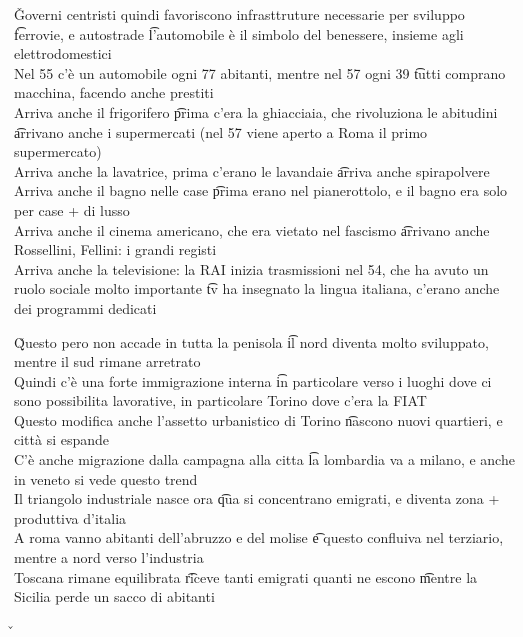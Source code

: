 \documentclass[12pt]{article}
\begin{document}
\v

Governi centristi quindi favoriscono infrasttruture necessarie per sviluppo \t ferrovie, e autostrade \t l'automobile è il simbolo del benessere, insieme agli elettrodomestici \\
Nel 55 c'è un automobile ogni 77 abitanti, mentre nel 57 ogni 39 \t tutti comprano macchina, facendo anche prestiti \\
Arriva anche il frigorifero \t prima c'era la ghiacciaia, che rivoluziona le abitudini \t arrivano anche i supermercati (nel 57 viene aperto a Roma il primo supermercato) \\
Arriva anche la lavatrice, prima c'erano le lavandaie \t arriva anche spirapolvere \\
Arriva anche il bagno nelle case \t prima erano nel pianerottolo, e il bagno era solo per case + di lusso \\
Arriva anche il cinema americano, che era vietato nel fascismo \t arrivano anche Rossellini, Fellini: i grandi registi \\
Arriva anche la televisione: la RAI inizia trasmissioni nel 54, che ha avuto un ruolo sociale molto importante \t tv ha insegnato la lingua italiana, c'erano anche dei programmi dedicati

\v

Questo pero non accade in tutta la penisola \t il nord diventa molto sviluppato, mentre il sud rimane arretrato \\
Quindi c'è una forte immigrazione interna \t in particolare verso i luoghi dove ci sono possibilita lavorative, in particolare Torino dove c'era la FIAT \\
Questo modifica anche l'assetto urbanistico di Torino \t nascono nuovi quartieri, e città si espande \\
C'è anche migrazione dalla campagna alla citta \t la lombardia va a milano, e anche in veneto si vede questo trend \\
Il triangolo industriale nasce ora \t qua si concentrano emigrati, e diventa zona + produttiva d'italia \\
A roma vanno abitanti dell'abruzzo e del molise \t e questo confluiva nel terziario, mentre a nord verso l'industria \\
Toscana rimane equilibrata \t riceve tanti emigrati quanti ne escono \t mentre la Sicilia perde un sacco di abitanti

\v
\end{document}
